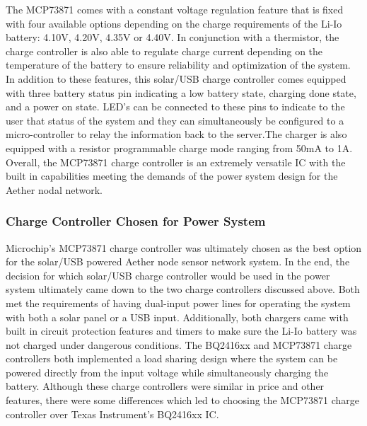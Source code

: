 The MCP73871 comes with a constant voltage regulation feature that is fixed with four available options depending on the charge requirements of the Li-Io battery: 4.10V, 4.20V, 4.35V or 4.40V. In conjunction with a thermistor, the charge controller is also able to regulate charge current depending on the temperature of the battery to ensure reliability and optimization of the system. In addition to these features, this solar/USB charge controller comes equipped with three battery status pin indicating a low battery state, charging done state, and a power on state. LED's can be connected to these pins to indicate to the user that status of the system and they can simultaneously be configured to a micro-controller to relay the information back to the server.The charger is also equipped with a resistor programmable charge mode ranging from 50mA to 1A. Overall, the MCP73871 charge controller is an extremely versatile IC with the built in capabilities meeting the demands of the power system design for the Aether nodal network.

\subsubsection{Charge Controller Chosen for Power System}
Microchip's MCP73871 charge controller was ultimately chosen as the best option for the solar/USB powered Aether node sensor network system. In the end, the decision for which solar/USB charge controller would be used in the power system ultimately came down to the two charge controllers discussed above. Both met the requirements of having dual-input power lines for operating the system with both a solar panel or a USB input. Additionally, both chargers came with built in circuit protection features and timers to make sure the Li-Io battery was not charged under dangerous conditions. The BQ2416xx and MCP73871 charge controllers both implemented a load sharing design where the system can be powered directly from the input voltage while simultaneously charging the battery. Although these charge controllers were similar in price and other features, there were some differences which led to choosing the MCP73871 charge controller over Texas Instrument's BQ2416xx IC. 


